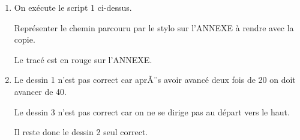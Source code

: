 \begin{enumerate}
\item On exécute le script 1 ci-dessus.

Représenter le chemin parcouru par le stylo sur l'ANNEXE à rendre avec la copie.

Le tracé est en rouge sur l'ANNEXE.
\item %


Le dessin 1  n'est  pas correct car aprÃ¨s avoir avancé deux fois de 20 on doit avancer de 40.

Le dessin 3  n'est  pas correct car on ne se dirige pas au départ vers le haut.

Il reste donc le dessin 2 seul correct.


\end{enumerate}
